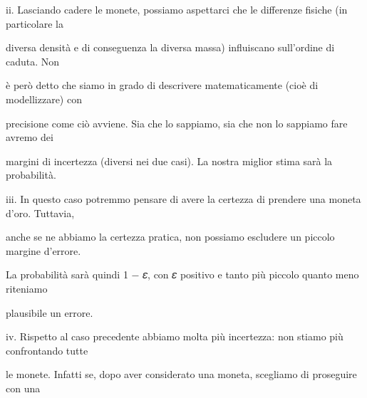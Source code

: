 \documentclass[a4paper,portrait,12pt]{article}
\begin{document}
\begin{flushleft}
ii. Lasciando cadere le monete, possiamo aspettarci che le differenze fisiche (in particolare la
\end{flushleft}


\begin{flushleft}
diversa densit\`{a} e di conseguenza la diversa massa) influiscano sull'ordine di caduta. Non
\end{flushleft}


\begin{flushleft}
\`{e} per\`{o} detto che siamo in grado di descrivere matematicamente (cio\`{e} di modellizzare) con
\end{flushleft}


\begin{flushleft}
precisione come ci\`{o} avviene. Sia che lo sappiamo, sia che non lo sappiamo fare avremo dei
\end{flushleft}


\begin{flushleft}
margini di incertezza (diversi nei due casi). La nostra miglior stima sar\`{a} la probabilit\`{a}.
\end{flushleft}


\begin{flushleft}
iii. In questo caso potremmo pensare di avere la certezza di prendere una moneta d'oro. Tuttavia,
\end{flushleft}


\begin{flushleft}
anche se ne abbiamo la certezza pratica, non possiamo escludere un piccolo margine d'errore.
\end{flushleft}


\begin{flushleft}
La probabilit\`{a} sar\`{a} quindi 1 $-$ 𝜀, con 𝜀 positivo e tanto più piccolo quanto meno riteniamo
\end{flushleft}


\begin{flushleft}
plausibile un errore.
\end{flushleft}


\begin{flushleft}
iv. Rispetto al caso precedente abbiamo molta più incertezza: non stiamo più confrontando tutte
\end{flushleft}


\begin{flushleft}
le monete. Infatti se, dopo aver considerato una moneta, scegliamo di proseguire con una
\end{flushleft}
\end{document}
